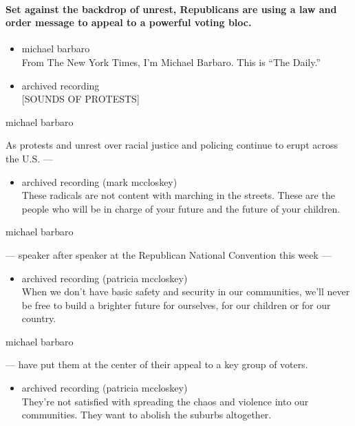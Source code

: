\hypertarget{set-against-the-backdrop-of-unrest-republicans-are-using-a-law-and-order-message-to-appeal-to-a-powerful-voting-bloc}{%
\paragraph{Set against the backdrop of unrest, Republicans are using a
law and order message to appeal to a powerful voting
bloc.}\label{set-against-the-backdrop-of-unrest-republicans-are-using-a-law-and-order-message-to-appeal-to-a-powerful-voting-bloc}}

\begin{itemize}
\item
  michael barbaro\\
  From The New York Times, I'm Michael Barbaro. This is ``The Daily.''
\item
  archived recording\\
  {[}SOUNDS OF PROTESTS{]}
\end{itemize}

michael barbaro

As protests and unrest over racial justice and policing continue to
erupt across the U.S. ---

\begin{itemize}
\tightlist
\item
  archived recording (mark mccloskey)\\
  These radicals are not content with marching in the streets. These are
  the people who will be in charge of your future and the future of your
  children.
\end{itemize}

michael barbaro

--- speaker after speaker at the Republican National Convention this
week ---

\begin{itemize}
\tightlist
\item
  archived recording (patricia mccloskey)\\
  When we don't have basic safety and security in our communities, we'll
  never be free to build a brighter future for ourselves, for our
  children or for our country.
\end{itemize}

michael barbaro

--- have put them at the center of their appeal to a key group of
voters.

\begin{itemize}
\tightlist
\item
  archived recording (patricia mccloskey)\\
  They're not satisfied with spreading the chaos and violence into our
  communities. They want to abolish the suburbs altogether.
\end{itemize}

